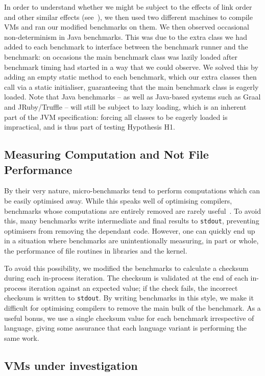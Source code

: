 \documentclass[preprint,numbers,10pt]{sigplanconf}
\begin{document}
In order to understand whether we might be subject to the effects of link
order and other similar effects (see~\cite{mytkowicz09surprising}),
we then used two different machines to compile VMs and ran our modified benchmarks
on them. We then observed occasional non-determinism in Java benchmarks.
This was due to the extra class we had added to each benchmark
to interface between the benchmark runner and the benchmark: on occasions the
main benchmark class was lazily loaded after benchmark timing had started in a
way that we could observe. We
solved this by adding an empty static method to each benchmark, which our
extra classes then call via a static initialiser, guaranteeing that
the main benchmark class is eagerly loaded. Note that Java
benchmarks -- as well as
Java-based systems such as Graal and JRuby/Truffle -- will still be subject to
lazy loading, which is an inherent part of the JVM specification: forcing all
classes to be eagerly loaded is impractical, and is thus part of testing
Hypothesis H1.


\subsection{Measuring Computation and Not File Performance}

By their very nature, micro-benchmarks tend to perform computations which
can be easily optimised away. While this speaks well of
optimising compilers, benchmarks whose computations
are entirely removed are rarely useful~\cite{seaton15phd}. To avoid this,
many benchmarks write intermediate and final results
to \texttt{stdout}, preventing optimisers from removing the dependant code.
However, one can quickly end up in a situation where benchmarks are
unintentionally measuring, in part or whole, the performance of file routines in
libraries and the kernel.

To avoid this possibility, we modified the benchmarks to calculate a checksum
during each in-process iteration.
The checksum is validated at the end of each in-process iteration against an expected
value; if the check fails, the incorrect checksum is written to \texttt{stdout}.
By writing benchmarks in
this style, we make it difficult for optimising compilers to remove the
main bulk of the benchmark. As a useful bonus, we use a single checksum value
for each benchmark irrespective of language, giving some assurance that each language variant is
performing the same work.


\subsection{VMs under investigation}
\end{document}
